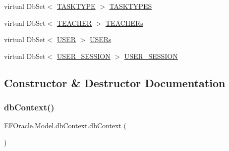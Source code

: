 \begin{DoxyCompactItemize}
\item 
virtual Db\+Set$<$ \hyperlink{class_e_f_oracle_1_1_model_1_1_t_a_s_k_t_y_p_e}{T\+A\+S\+K\+T\+Y\+PE} $>$ \hyperlink{class_e_f_oracle_1_1_model_1_1db_context_a943a716657ad3f7ccccbfa5a50e8cf0b}{T\+A\+S\+K\+T\+Y\+P\+ES}
\item 
virtual Db\+Set$<$ \hyperlink{class_e_f_oracle_1_1_model_1_1_t_e_a_c_h_e_r}{T\+E\+A\+C\+H\+ER} $>$ \hyperlink{class_e_f_oracle_1_1_model_1_1db_context_ae314b6a52d4ba6dab7d47687f70ff1ae}{T\+E\+A\+C\+H\+E\+Rs}
\item 
virtual Db\+Set$<$ \hyperlink{class_e_f_oracle_1_1_model_1_1_u_s_e_r}{U\+S\+ER} $>$ \hyperlink{class_e_f_oracle_1_1_model_1_1db_context_aa300c467cc435086d3610121fc2a6545}{U\+S\+E\+Rs}
\item 
virtual Db\+Set$<$ \hyperlink{class_e_f_oracle_1_1_model_1_1_u_s_e_r___s_e_s_s_i_o_n}{U\+S\+E\+R\+\_\+\+S\+E\+S\+S\+I\+ON} $>$ \hyperlink{class_e_f_oracle_1_1_model_1_1db_context_a8b948de9dbd472af5e756d7f8aecd18f}{U\+S\+E\+R\+\_\+\+S\+E\+S\+S\+I\+ON}
\end{DoxyCompactItemize}


\subsection{Constructor \& Destructor Documentation}
\mbox{\label{class_e_f_oracle_1_1_model_1_1db_context_a5583d9c5a470911b15527260b9974eb3}} 
\subsubsection{\texorpdfstring{db\+Context()}{dbContext()}}
{\footnotesize\ttfamily E\+F\+Oracle.\+Model.\+db\+Context.\+db\+Context (\begin{DoxyParamCaption}{ }\end{DoxyParamCaption})}



